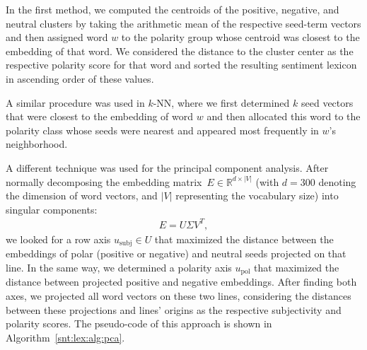 In the first method, we computed the centroids of the positive,
negative, and neutral clusters by taking the arithmetic mean of the
respective seed-term vectors and then assigned word $w$ to the
polarity group whose centroid was closest to the embedding of that
word.  We considered the distance to the cluster center as the
respective polarity score for that word and sorted the resulting
sentiment lexicon in ascending order of these values.

A similar procedure was used in $k$-NN, where we first determined $k$
seed vectors that were closest to the embedding of word $w$ and then
allocated this word to the polarity class whose seeds were nearest and
appeared most frequently in $w$'s neighborhood.

A different technique was used for the principal component analysis.
After normally decomposing the embedding
matrix~$E\in\mathbb{R}^{d\times|V|}$ (with $d = 300$ denoting the
dimension of word vectors, and $|V|$ representing the vocabulary size)
into singular components:
\begin{align*}
  E = U \Sigma V^T,
\end{align*}
we looked for a row axis $u_{\textrm{subj}}\in U$ that maximized the
distance between the embeddings of polar (positive or negative) and
neutral seeds projected on that line.  In the same way, we determined
a polarity axis $u_{\textrm{pol}}$ that maximized the distance between
projected positive and negative embeddings.  After finding both axes,
we projected all word vectors on these two lines, considering the
distances between these projections and lines' origins as the
respective subjectivity and polarity scores.  The pseudo-code of this
approach is shown in Algorithm~\ref{snt:lex:alg:pca}.

